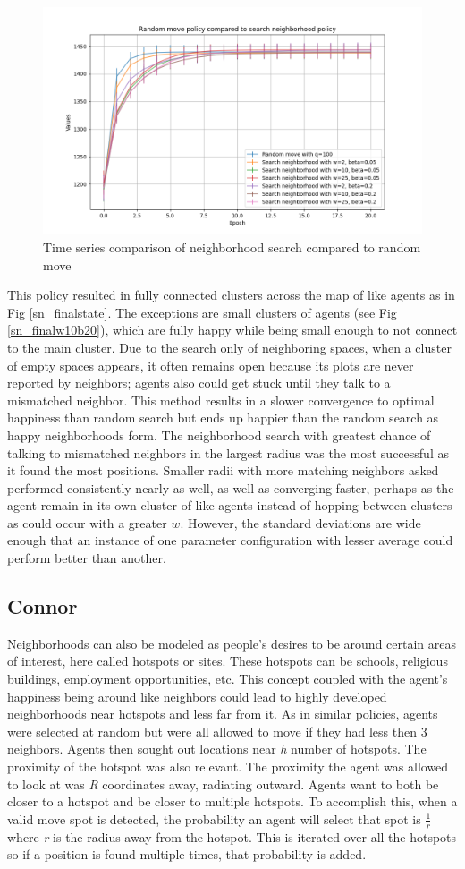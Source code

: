 \documentclass[11pt]{article}
\begin{document}
	\begin{figure}
		\centering
		\includegraphics[width=.5\textwidth]{policies02.png}
		\caption{Time series comparison of neighborhood search compared to random move}
	\end{figure}
		\vspace{-.5em} %
	This policy resulted in fully connected clusters across the map of like agents as in Fig \ref{sn_finalstate}. The exceptions are small clusters of agents (see Fig \ref{sn_finalw10b20}), which are fully happy while being small enough to not connect to the main cluster. Due to the search only of neighboring spaces, when a cluster of empty spaces appears, it often remains open because its plots are never reported by neighbors; agents also could get stuck until they talk to a mismatched neighbor. This method results in a slower convergence to optimal happiness than random search but ends up happier than the random search as happy neighborhoods form. The neighborhood search with greatest chance of talking to mismatched neighbors in the largest radius was the most successful as it found the most positions. Smaller radii with more matching neighbors asked performed consistently nearly as well, as well as converging faster, perhaps as the agent remain in its own cluster of like agents instead of hopping between  clusters as could occur with a greater $w$. However, the standard deviations are wide enough that an instance of one parameter configuration with lesser average could perform better than another.
	
	\newpage
	
	\subsection{Connor}
	Neighborhoods can also be modeled as people’s desires to be around certain areas of interest, here called hotspots or sites. These hotspots can be schools, religious buildings, employment opportunities, etc. This concept coupled with the agent’s happiness being around like neighbors could lead to highly developed neighborhoods near hotspots and less far from it. As in similar policies, agents were selected at random but were all allowed to move if they had less then 3 neighbors. Agents then sought out locations near \textit{h} number of hotspots. The proximity of the hotspot was also relevant. The proximity the agent was allowed to look at was \textit{R} coordinates away, radiating outward. Agents want to both be closer to a hotspot and be closer to multiple hotspots. To accomplish this, when a valid move spot is detected, the probability an agent will select that spot is $\frac{1}{r}$ where \textit{r} is the radius away from the hotspot. This is iterated over all the hotspots so if a position is found multiple times, that probability is added.
\end{document}
